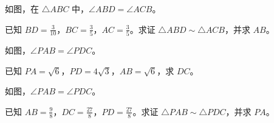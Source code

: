 \documentclass{exam-zh}
\begin{document}
\begin{problem}[points=10]
  \noindent
  \begin{minipage}[t]{\dimexpr\linewidth-60mm-6mm\relax}
    \vspace{0pt}
    如图，在 $\triangle ABC$ 中，$\angle ABD=\angle ACB$。

已知 $BD=\frac{3}{10}$，$BC=\frac{3}{5}$，$AC=\frac{3}{5}$。求证 $\triangle ABD\sim\triangle ACB$，并求 $AB$。
    
  \end{minipage}\hfill
  \begin{diagramcoltikz}{60mm}{先确认对应边，再判断题中的线段是否属于相似三角形。}
  }
  \end{diagramcoltikz}
  \par\medskip
  \answerarea[48mm]
\end{problem}



\begin{problem}[points=10]
  \noindent
  \begin{minipage}[t]{\dimexpr\linewidth-60mm-6mm\relax}
    \vspace{0pt}
    如图，$\angle PAB=\angle PDC$。

已知 $PA=\sqrt{6}$，$PD=4\sqrt{3}$，$AB=\sqrt{6}$，求 $DC$。
    
  \end{minipage}\hfill
  \begin{diagramcoltikz}{60mm}{沿题设等角的顶点顺序，找出两组三角形的对应边。}
  }
  \end{diagramcoltikz}
  \par\medskip
  \answerarea[48mm]
\end{problem}



\begin{problem}[points=10]
  \noindent
  \begin{minipage}[t]{\dimexpr\linewidth-60mm-6mm\relax}
    \vspace{0pt}
    如图，$\angle PAB=\angle PDC$。

已知 $AB=\frac{9}{8}$，$DC=\frac{27}{8}$，$PD=\frac{27}{8}$。求证 $\triangle PAB\sim\triangle PDC$，并求 $PA$。
    
  \end{minipage}\hfill
  \begin{diagramcoltikz}{60mm}{沿题设等角的顶点顺序，找出两组三角形的对应边。}
  }
  \end{diagramcoltikz}
  \par\medskip
  \answerarea[48mm]
\end{problem}
\end{document}
